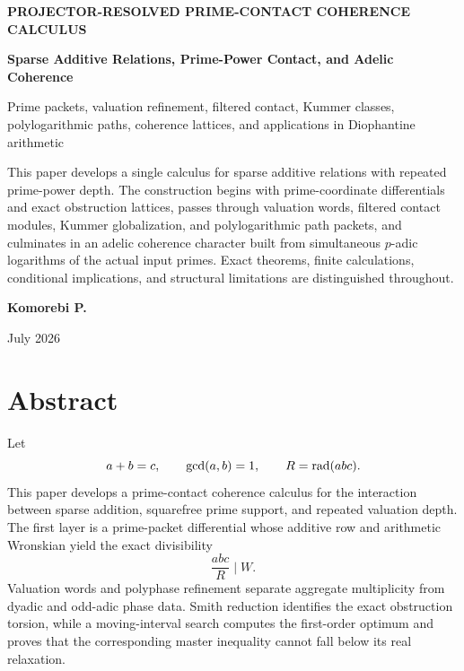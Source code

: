 \frontmatter
\begin{titlepage}
\thispagestyle{empty}
\centering
\vspace*{0.52in}
{\Large\color{Blue}\bfseries PROJECTOR-RESOLVED PRIME-CONTACT COHERENCE CALCULUS\par}
\vspace{0.22in}
{\Huge\bfseries Sparse Additive Relations, Prime-Power Contact, and Adelic Coherence\par}
\vspace{0.20in}
{\Large\color{Muted}Prime packets, valuation refinement, filtered contact, Kummer classes, polylogarithmic paths, coherence lattices, and applications in Diophantine arithmetic\par}
\vspace{0.50in}
\begin{minipage}{0.88\textwidth}
\large
This paper develops a single calculus for sparse additive relations with repeated prime-power depth. The construction begins with prime-coordinate differentials and exact obstruction lattices, passes through valuation words, filtered contact modules, Kummer globalization, and polylogarithmic path packets, and culminates in an adelic coherence character built from simultaneous $p$-adic logarithms of the actual input primes. Exact theorems, finite calculations, conditional implications, and structural limitations are distinguished throughout.
\end{minipage}
\vfill
{\Large\bfseries Komorebi P.\par}
\vspace{0.30in}
{\large July 2026\par}
\end{titlepage}

\chapter*{Abstract}
Let
\[
 a+b=c,
 \qquad
 \gcd(a,b)=1,
 \qquad
 R=\operatorname{rad}(abc).
\]
This paper develops a prime-contact coherence calculus for the interaction between sparse addition, squarefree prime support, and repeated valuation depth. The first layer is a prime-packet differential whose additive row and arithmetic Wronskian yield the exact divisibility
\[
 \frac{abc}{R}\mid W.
\]
Valuation words and polyphase refinement separate aggregate multiplicity from dyadic and odd-adic phase data. Smith reduction identifies the exact obstruction torsion, while a moving-interval search computes the first-order optimum and proves that the corresponding master inequality cannot fall below its real relaxation.

